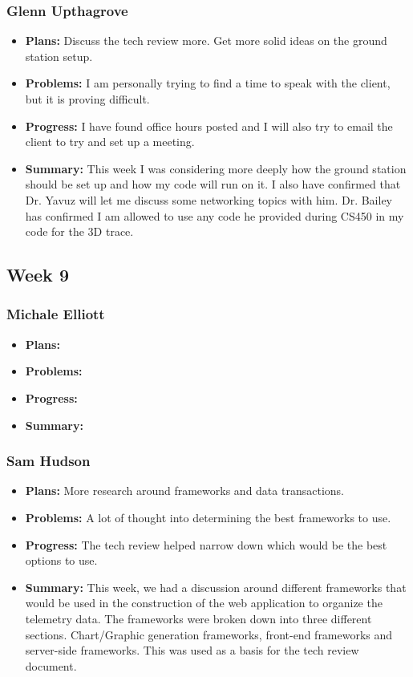 \documentclass[onecolumn, draftclsnofoot,10pt, compsoc]{IEEEtran}
\begin{document}
\subsubsection{Glenn Upthagrove}
\begin {itemize}
 \item \textbf{Plans: }Discuss the tech review more. Get more solid ideas on the ground station setup. 
 \item \textbf{Problems: }I am personally trying to find a time to speak with the client, but it is proving difficult. 
 \item \textbf{Progress: }I have found office hours posted and I will also try to email the client to try and set up a meeting.
 \item \textbf{Summary: }This week I was considering more deeply how the ground station should be set up and how my code will run on it. I also have confirmed that Dr. Yavuz will let me discuss some networking topics with him. Dr. Bailey has confirmed I am allowed to use any code he provided during CS450 in my code for the 3D trace.  
\end {itemize}
\subsection {Week 9}
\subsubsection{Michale Elliott}
\begin {itemize}
 \item \textbf{Plans: }
 \item \textbf{Problems: }
 \item \textbf{Progress: }
 \item \textbf{Summary: }
\end {itemize}
\subsubsection{Sam Hudson}
\begin {itemize}
\item \textbf{Plans: }More research around frameworks and data transactions. 
\item \textbf{Problems: }A lot of thought into determining the best frameworks to use.
\item \textbf{Progress: }The tech review helped narrow down which would be the best options to use.
\item \textbf{Summary: }This week, we had a discussion around different frameworks that would be used in the construction of the web application to organize the telemetry data.  The frameworks were broken down into three different sections. Chart/Graphic generation frameworks, front-end frameworks and server-side frameworks. This was used as a basis for the tech review document. 
\end {itemize}
\end{document}
